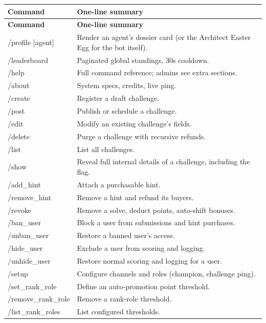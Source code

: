\documentclass[12pt,a4paper]{report}
\begin{document}
\begin{longtable}{>{\ttfamily}l p{9.5cm}}
\toprule
\textbf{Command} & \textbf{One-line summary} \\
\midrule
\endfirsthead
\toprule
\textbf{Command} & \textbf{One-line summary} \\
\midrule
\endhead
/profile [agent]      & Render an agent's dossier card (or the Architect Easter Egg for the bot itself). \\
/leaderboard           & Paginated global standings, 30s cooldown. \\
/help                  & Full command reference; admins see extra sections. \\
/about                 & System specs, credits, live ping. \\
/create                & Register a draft challenge. \\
/post                  & Publish or schedule a challenge. \\
/edit                  & Modify an existing challenge's fields. \\
/delete                & Purge a challenge with recursive refunds. \\
/list                  & List all challenges. \\
/show                  & Reveal full internal details of a challenge, including the flag. \\
/add\_hint             & Attach a purchasable hint. \\
/remove\_hint          & Remove a hint and refund its buyers. \\
/revoke                & Remove a solve, deduct points, auto-shift bonuses. \\
/ban\_user             & Block a user from submissions and hint purchases. \\
/unban\_user           & Restore a banned user's access. \\
/hide\_user            & Exclude a user from scoring and logging. \\
/unhide\_user          & Restore normal scoring and logging for a user. \\
/setup                 & Configure channels and roles (champion, challenge ping). \\
/set\_rank\_role       & Define an auto-promotion point threshold. \\
/remove\_rank\_role    & Remove a rank-role threshold. \\
/list\_rank\_roles     & List configured thresholds. \\

\end{longtable}
\end{document}
